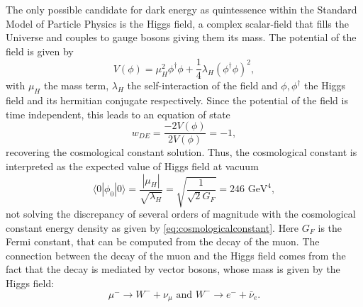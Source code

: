 The only possible candidate for dark energy as quintessence within the Standard Model of Particle Physics is the Higgs field, a complex scalar-field that fills the Universe and couples to gauge bosons giving them its mass. The potential of the field is given by
\begin{equation}
V(\phi) = \mu_H^2\phi^\dagger\phi+\frac{1}{4}\lambda_H(\phi^\dagger\phi)^2,
\end{equation}
with $\mu_H$ the mass term, $\lambda_H$ the self-interaction of the field and $\phi,\phi^\dagger$ the Higgs field and its hermitian conjugate respectively. Since the potential of the field is time independent, this leads to an equation of state
\begin{equation}
w_{DE} = \frac{-2V(\phi)}{2V(\phi)} = -1,
\end{equation}
recovering the cosmological constant solution. Thus, the cosmological constant is interpreted as the expected value of Higgs field at vacuum
\begin{equation}
\langle 0|\phi_0|0\rangle = \frac{|\mu_H|}{\sqrt{\lambda_H}}= \sqrt{\frac{1}{\sqrt{2}G_F}}= 246\mbox{ GeV}^4,
\end{equation}
not solving the discrepancy of several orders of magnitude with the cosmological constant energy density as given by \autoref{eq:cosmologicalconstant}. Here $G_F$ is the Fermi constant, that can be computed from the decay of the muon. The connection between the decay of the muon and the Higgs field comes from the fact that the decay is mediated by vector bosons, whose mass is given by the Higgs field:
\begin{equation}
\mu^- \rightarrow W^- + \nu_\mu \mbox{ and }W^-\rightarrow e^-+\bar\nu_e.
\end{equation}
\newline

